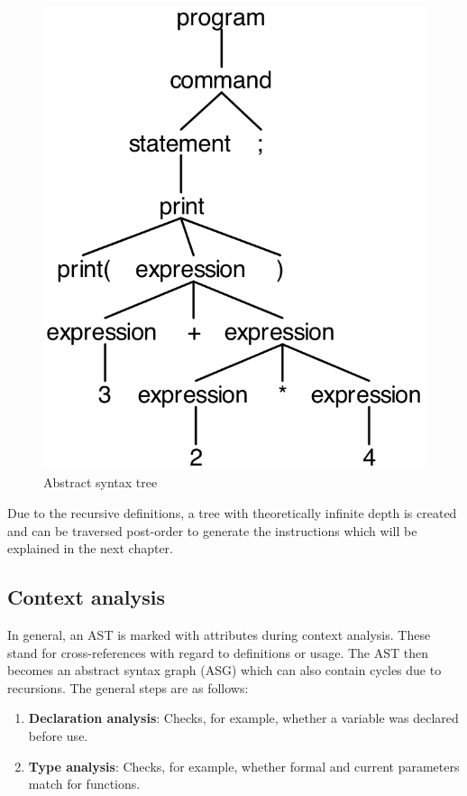 \begin{figure}[bth]
	\centering
	\includegraphics[scale=0.65]{./img/ast}
	\caption[Abstract syntax]{Abstract syntax tree}
	\label{fig:ast}
\end{figure}
\noindent

Due to the recursive definitions, a tree with theoretically infinite depth is created and can be traversed post-order to generate the instructions which will be explained in the next chapter.

\subsection{Context analysis}
\label{sec:context_analysis}

In general, an AST is marked with attributes during context analysis. These stand for cross-references with regard to definitions or usage. The AST then becomes an abstract syntax graph (ASG) which can also contain cycles due to recursions. The general steps are as follows:

\begin{enumerate}
	\item \textbf{Declaration analysis}: Checks, for example, whether a variable was declared before use.  
	\item \textbf{Type analysis}: Checks, for example, whether formal and current parameters match for functions.
\end{enumerate}


